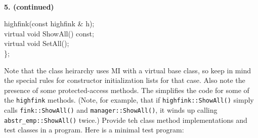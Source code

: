 \documentclass[10 pt]{amsart}
\newlength{\cwidth}
\newenvironment{cpartContinued}[2][\cwidth]
	{%
		\\ %
		\textbf{#2. (continued)}%
		\\
		\phantom{#2. }
		\begin{minipage}[t]{#1}%
		\setlength{\parindent}{0pt}%
		\setlength{\parskip}{2ex}%
	}
	{%
		\end{minipage}%
	}
\newcommand{\ttt}[1]{\texttt{#1}}
\begin{document}
\begin{cpartContinued}{5}
{\begin{tabbing}
					highfink(const highfink \& h); \\
					virtual void ShowAll() const; \\
					virtual void SetAll(); \\
				\< \}; 
			\end{tabbing}
		}
		Note that the class heirarchy uses MI with a virtual base class,
		so keep in mind the special rules for constructor initialization
		lists for that case.
		Also note the presence of some protected-access methods.
		The simplifies the code for some of the \ttt{highfink}
		methods.
		(Note, for example, that if \ttt{highfink::ShowAll()} simply
		calls \ttt{fink::ShowAll()} and \ttt{manager::ShowAll()}, it
		winds up calling \ttt{abstr\_emp::ShowAll()} twice.)
		Provide teh class method implementations and test classes in 
		a program.
		Here is a minimal test program: 
	\end{cpartContinued}
	\newpage
\end{document}
